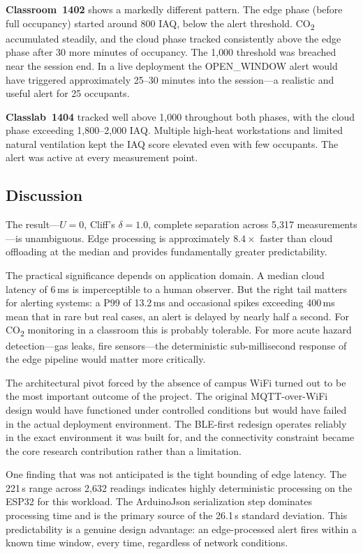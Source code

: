 \documentclass[12pt, a4paper]{article}
\newcommand{\us}{\,\textmu s}
\newcommand{\ms}{\,ms}
\begin{document}
\textbf{Classroom~1402} shows a markedly different pattern. The edge
phase (before full occupancy) started around 800 IAQ, below the alert
threshold. CO\textsubscript{2} accumulated steadily, and the cloud
phase tracked consistently above the edge phase after 30 more minutes
of occupancy. The 1{,}000 threshold was breached near the session end.
In a live deployment the OPEN\_WINDOW alert would have triggered
approximately 25--30 minutes into the session---a realistic and useful
alert for 25 occupants.

\textbf{Classlab~1404} tracked well above 1{,}000 throughout both
phases, with the cloud phase exceeding 1{,}800--2{,}000 IAQ. Multiple
high-heat workstations and limited natural ventilation kept the IAQ
score elevated even with few occupants. The alert was active at every
measurement point.

\subsection{Discussion}

The result---$U = 0$, Cliff's $\delta = 1.0$, complete separation
across 5{,}317 measurements---is unambiguous. Edge processing is
approximately $8.4\times$ faster than cloud offloading at the median
and provides fundamentally greater predictability.

The practical significance depends on application domain. A median
cloud latency of 6\ms{} is imperceptible to a human observer. But the
right tail matters for alerting systems: a P99 of 13.2\ms{} and
occasional spikes exceeding 400\ms{} mean that in rare but real cases,
an alert is delayed by nearly half a second. For CO\textsubscript{2}
monitoring in a classroom this is probably tolerable. For more acute
hazard detection---gas leaks, fire sensors---the deterministic
sub-millisecond response of the edge pipeline would matter more
critically.

The architectural pivot forced by the absence of campus WiFi turned
out to be the most important outcome of the project. The original
MQTT-over-WiFi design would have functioned under controlled conditions
but would have failed in the actual deployment environment. The
BLE-first redesign operates reliably in the exact environment it was
built for, and the connectivity constraint became the core research
contribution rather than a limitation.

One finding that was not anticipated is the tight bounding of edge
latency. The 221\us{} range across 2{,}632 readings indicates highly
deterministic processing on the ESP32 for this workload. The
ArduinoJson serialization step dominates processing time and is the
primary source of the 26.1\us{} standard deviation. This
predictability is a genuine design advantage: an edge-processed alert
fires within a known time window, every time, regardless of network
conditions.
\end{document}
